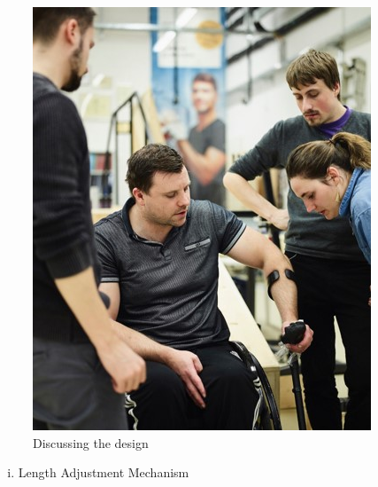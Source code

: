 \begin{figure}
    \centering
    \includegraphics{Appendix/User-centered_design_method/WS_EKZ.jpg}
    \caption{Discussing the design}
    \label{fig:ekz}
\end{figure}
\cleardoublepage
\label{subsec:Ergonomic Design}


\label{subsec:EC requirements}

\label{subsec:list of modes}


\begin{enumerate}[ii.]
\item{Length Adjustment Mechanism}
\end{enumerate}
\label{subsec:LAM}


